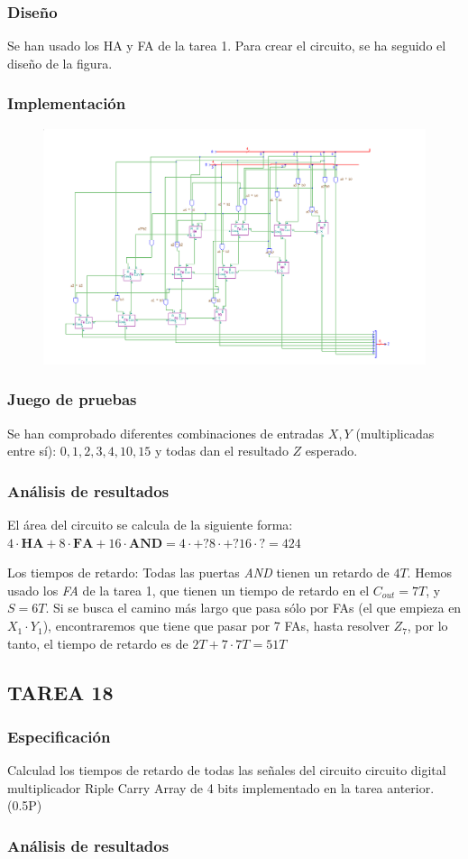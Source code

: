 \documentclass{article}
\begin{document}
		\subsubsection*{Diseño}
		Se han usado los HA y FA de la tarea 1. Para crear el circuito, se ha seguido el diseño de la figura.


		\subsubsection*{Implementación}
		 \begin{figure}[ht]
		 	\includegraphics[width=0.8\linewidth]{RCA4}
		 	\centering
		 \end{figure}


		\subsubsection*{Juego de pruebas}
		Se han comprobado diferentes combinaciones de entradas $X,Y$ (multiplicadas entre sí): $0, 1, 2, 3, 4, 10, 15$ y todas dan el resultado $Z$ esperado.


		\subsubsection*{Análisis de resultados}
		El área del circuito se calcula de la siguiente forma:
		$4\cdot\textbf{HA} + 8\cdot\textbf{FA} + 16\cdot\textbf{AND} = 4\cdot+? 8\cdot+? 16\cdot? = 424$
		
		Los tiempos de retardo:
		Todas las puertas \textit{AND} tienen un retardo de $4T$.
		Hemos usado los \textit{FA} de la tarea 1, que tienen un tiempo de retardo en el $C_{out} = 7T$, y $S = 6T$.
		Si se busca el camino más largo que pasa sólo por FAs (el que empieza en $X_1\cdot Y_1$), encontraremos que tiene que pasar por 7 FAs,  hasta resolver $Z_7$,
		por lo tanto, el tiempo de retardo es de $2T + 7\cdot7T = 51T$


	\subsection{TAREA 18}
		\subsubsection*{Especificación}
		Calculad los tiempos de retardo de todas las señales del circuito circuito digital
		multiplicador Riple Carry Array de 4 bits implementado en la tarea anterior. (0.5P)



		\subsubsection*{Análisis de resultados}
		
\end{document}
